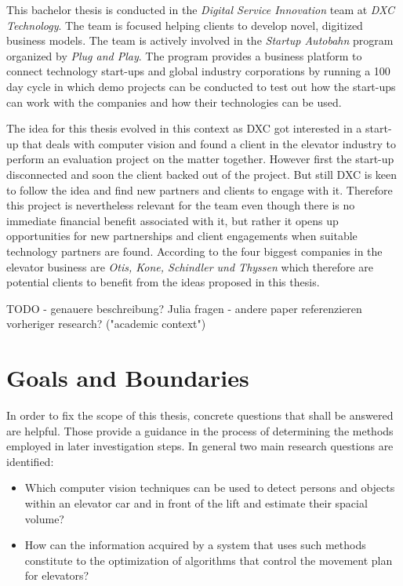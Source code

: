 This bachelor thesis is conducted in the \emph{Digital Service Innovation} team at \emph{DXC Technology}.
The team is focused helping clients to develop novel, digitized business models.
The team is actively involved in the \emph{Startup Autobahn} program organized by \emph{Plug and Play}.
The program provides a business platform to connect technology start-ups and global industry corporations
by running a 100 day cycle in which demo projects can be conducted to test out how the start-ups can work with the companies and how their technologies can be used.

The idea for this thesis evolved in this context as DXC got interested in a start-up that deals with computer vision and found a client in the elevator industry to perform an evaluation project on the matter together.
However first the start-up disconnected and soon the client backed out of the project.
But still DXC is keen to follow the idea and find new partners and clients to engage with it.
Therefore this project is nevertheless relevant for the team even though there is no immediate financial benefit associated with it, 
but rather it opens up opportunities for new partnerships and client engagements when suitable technology partners are found.
According to \textcite[][p.~4]{unger2015aufzuege} the four biggest companies in the elevator business are \emph{Otis, Kone, Schindler und Thyssen} which therefore are potential clients to benefit from the ideas proposed in this thesis.



TODO
- genauere beschreibung? Julia fragen
- andere paper referenzieren vorheriger research? ("academic context")


\section{Goals and Boundaries}

In order to fix the scope of this thesis, concrete questions that shall be answered are helpful.
Those provide a guidance in the process of determining the methods employed in later investigation steps.
In general two main research questions are identified:

\begin{itemize}
    \item Which computer vision techniques can be used to detect persons and objects within an elevator car and in front of the lift and estimate their spacial volume?
    \item How can the information acquired by a system that uses such methods constitute to the optimization of algorithms that control the movement plan for elevators?
\end{itemize}

